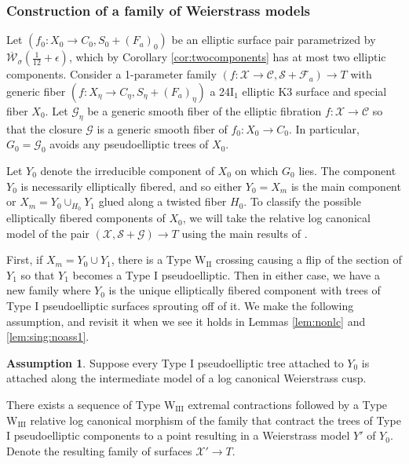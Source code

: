\documentclass[11pt]{amsart}
\theoremstyle{definition}
\newtheorem{assumption}[theorem]{Assumption}
\theoremstyle{remark}
\newcommand{\calW}{\mathcal W}
\newcommand{\wii}{\mathrm{W}_{\mathrm{II}}}
\newcommand{\ktwelve}{\overline{\calW}_\sigma({\frac{1}{12}+\epsilon})}
\begin{document}
	\subsubsection{Construction of a family of Weierstrass models}\label{rmk:construction} 
	Let $(f_0 : X_0 \to C_0, S_0 + (F_a)_0)$ be an elliptic surface pair parametrized by $\ktwelve$, which by Corollary \ref{cor:twocomponents} has at most two elliptic components. Consider a 1-parameter family $(f : \mathscr{X} \to \mathscr{C}, \mathscr{S} + \mathscr{F}_a) \to T$ with generic fiber $(f : X_\eta \to C_\eta, S_\eta + (F_a)_\eta)$ a 24$\mathrm{I}_1$ elliptic K3 surface and special fiber $X_0$. Let $\mathscr{G}_\eta$ be a generic smooth fiber of the elliptic fibration $f: \mathscr{X} \to \mathscr{C}$ so that the closure $\mathscr{G}$ is a generic smooth fiber of $f_0 : X_0 \to C_0$. In particular, $G_0 = \mathscr{G}_0$ avoids any pseudoelliptic trees of $X_0$. 
	
	Let $Y_0$ denote the irreducible component of $X_0$ on which $G_0$ lies. The component $Y_0$ is necessarily elliptically fibered, and so either $Y_0 = X_m$ is the main component or $X_m = Y_0 \cup_{H_0} Y_1$ glued along a twisted fiber $H_0$. To classify the possible elliptically fibered components of $X_0$, we will take the relative log canonical model of the pair $(\mathscr{X}, \mathscr{S} + \mathscr{G}) \to T$ using the main results of \cite{master}. 
	
	First, if $X_m = Y_0 \cup Y_1$, there is a Type $\wii$ crossing causing a flip of the section of $Y_1$ so that $Y_1$ becomes a Type $\mathrm{I}$ pseudoelliptic. Then in either case, we have a new family where $Y_0$ is the unique elliptically fibered component with trees of Type $\mathrm{I}$ pseudoelliptic surfaces sprouting off of it. We make the following assumption, and revisit it when we see it holds in Lemmas \ref{lem:nonlc} and \ref{lem:sing:noass1}.
	
	\begin{assumption}\label{ass:1} Suppose every Type $\mathrm{I}$ pseudoelliptic tree attached to $Y_0$ is attached along the intermediate model of a log canonical Weierstrass cusp.
	\end{assumption}
	
	There exists a sequence of Type $\mathrm{W}_\mathrm{III}$ extremal contractions followed by a Type $\mathrm{W}_\mathrm{III}$ relative log canonical morphism of the family that contract the trees of Type $\mathrm{I}$ pseudoelliptic components to a point resulting in a Weierstrass model $Y'$ of $Y_0$. Denote the resulting family of surfaces $\mathscr{X}' \to T$. 
	
\end{document}

